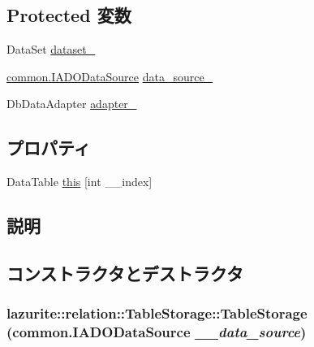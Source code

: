 \subsection*{Protected 変数}
\begin{DoxyCompactItemize}
\item 
DataSet \hyperlink{classlazurite_1_1relation_1_1_table_storage_a553adcec9d2c2f0efeff1f36150134e7}{dataset\_\-}
\item 
\hyperlink{interfacelazurite_1_1relation_1_1common_1_1_i_a_d_o_data_source}{common.IADODataSource} \hyperlink{classlazurite_1_1relation_1_1_table_storage_a1398be83b8a883ef7c9d01e478068de5}{data\_\-source\_\-}
\item 
DbDataAdapter \hyperlink{classlazurite_1_1relation_1_1_table_storage_a9aedb9b52764b00735b82a419377fa16}{adapter\_\-}
\end{DoxyCompactItemize}
\subsection*{プロパティ}
\begin{DoxyCompactItemize}
\item 
DataTable \hyperlink{classlazurite_1_1relation_1_1_table_storage_aaf6dac4136fc070b9c173b4c8231089d}{this} \mbox{[}int \_\-\_\-index\mbox{]}
\end{DoxyCompactItemize}


\subsection{説明}


\subsection{コンストラクタとデストラクタ}
\hypertarget{classlazurite_1_1relation_1_1_table_storage_a9f9c6fa79fc56dd2cf4789e20f4d6431}{
\subsubsection[{TableStorage}]{\setlength{\rightskip}{0pt plus 5cm}lazurite::relation::TableStorage::TableStorage ({\bf common.IADODataSource} {\em \_\-\_\-data\_\-source})}}
\label{classlazurite_1_1relation_1_1_table_storage_a9f9c6fa79fc56dd2cf4789e20f4d6431}

